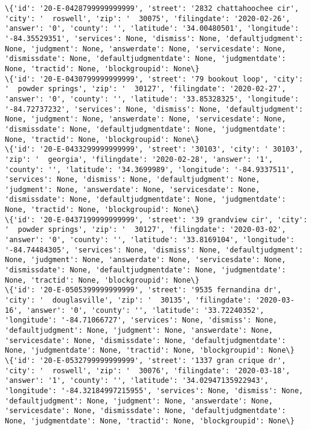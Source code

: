 \documentclass[11pt]{article}
\begin{document}
\begin{Verbatim}[commandchars=\\\{\}]
\{'id': '20-E-0428799999999999', 'street': '2832 chattahoochee cir', 'city': '  roswell', 'zip': '  30075', 'filingdate': '2020-02-26', 'answer': '0', 'county': '', 'latitude': '34.00480501', 'longitude': '-84.35529351', 'services': None, 'dismiss': None, 'defaultjudgment': None, 'judgment': None, 'answerdate': None, 'servicesdate': None, 'dismissdate': None, 'defaultjudgmentdate': None, 'judgmentdate': None, 'tractid': None, 'blockgroupid': None\}
\{'id': '20-E-0430799999999999', 'street': '79 bookout loop', 'city': '  powder springs', 'zip': '  30127', 'filingdate': '2020-02-27', 'answer': '0', 'county': '', 'latitude': '33.85328325', 'longitude': '-84.72737232', 'services': None, 'dismiss': None, 'defaultjudgment': None, 'judgment': None, 'answerdate': None, 'servicesdate': None, 'dismissdate': None, 'defaultjudgmentdate': None, 'judgmentdate': None, 'tractid': None, 'blockgroupid': None\}
\{'id': '20-E-0433299999999999', 'street': '30103', 'city': ' 30103', 'zip': '  georgia', 'filingdate': '2020-02-28', 'answer': '1', 'county': '', 'latitude': '34.3699989', 'longitude': '-84.9337511', 'services': None, 'dismiss': None, 'defaultjudgment': None, 'judgment': None, 'answerdate': None, 'servicesdate': None, 'dismissdate': None, 'defaultjudgmentdate': None, 'judgmentdate': None, 'tractid': None, 'blockgroupid': None\}
\{'id': '20-E-0437199999999999', 'street': '39 grandview cir', 'city': '  powder springs', 'zip': '  30127', 'filingdate': '2020-03-02', 'answer': '0', 'county': '', 'latitude': '33.8169104', 'longitude': '-84.74484305', 'services': None, 'dismiss': None, 'defaultjudgment': None, 'judgment': None, 'answerdate': None, 'servicesdate': None, 'dismissdate': None, 'defaultjudgmentdate': None, 'judgmentdate': None, 'tractid': None, 'blockgroupid': None\}
\{'id': '20-E-0505399999999999', 'street': '9535 fernandina dr', 'city': '  douglasville', 'zip': '  30135', 'filingdate': '2020-03-16', 'answer': '0', 'county': '', 'latitude': '33.72240352', 'longitude': '-84.71066727', 'services': None, 'dismiss': None, 'defaultjudgment': None, 'judgment': None, 'answerdate': None, 'servicesdate': None, 'dismissdate': None, 'defaultjudgmentdate': None, 'judgmentdate': None, 'tractid': None, 'blockgroupid': None\}
\{'id': '20-E-0532799999999999', 'street': '1337 gran crique dr', 'city': '  roswell', 'zip': '  30076', 'filingdate': '2020-03-18', 'answer': '1', 'county': '', 'latitude': '34.02947135922943', 'longitude': '-84.32184997215955', 'services': None, 'dismiss': None, 'defaultjudgment': None, 'judgment': None, 'answerdate': None, 'servicesdate': None, 'dismissdate': None, 'defaultjudgmentdate': None, 'judgmentdate': None, 'tractid': None, 'blockgroupid': None\}

\end{Verbatim}
\end{document}

